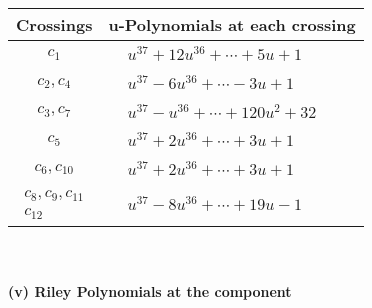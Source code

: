 \documentclass[1p]{elsarticle_modified}
\theoremstyle{definition}
\begin{document}
\begin{tabular}{m{50pt}|m{274pt}}
Crossings & \hspace{64pt}u-Polynomials at each crossing \\
\hline $$\begin{aligned}c_{1}\end{aligned}$$&$\begin{aligned}
&u^{37}+12 u^{36}+\cdots+5 u+1
\end{aligned}$\\
\hline $$\begin{aligned}c_{2},c_{4}\end{aligned}$$&$\begin{aligned}
&u^{37}-6 u^{36}+\cdots-3 u+1
\end{aligned}$\\
\hline $$\begin{aligned}c_{3},c_{7}\end{aligned}$$&$\begin{aligned}
&u^{37}- u^{36}+\cdots+120 u^2+32
\end{aligned}$\\
\hline $$\begin{aligned}c_{5}\end{aligned}$$&$\begin{aligned}
&u^{37}+2 u^{36}+\cdots+3 u+1
\end{aligned}$\\
\hline $$\begin{aligned}c_{6},c_{10}\end{aligned}$$&$\begin{aligned}
&u^{37}+2 u^{36}+\cdots+3 u+1
\end{aligned}$\\
\hline $$\begin{aligned}c_{8},c_{9},c_{11}\\c_{12}\end{aligned}$$&$\begin{aligned}
&u^{37}-8 u^{36}+\cdots+19 u-1
\end{aligned}$\\
\hline
\end{tabular}\\~\\
\newpage\renewcommand{\arraystretch}{1}
\flushleft \textbf{(v) Riley Polynomials at the component}\newline \\
\end{document}
